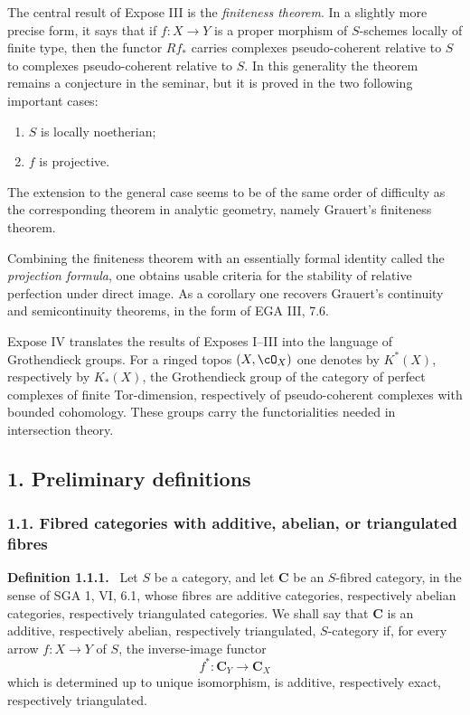 \documentclass[11pt]{article}
\theoremstyle{plain}
\theoremstyle{definition}
\theoremstyle{remark}
\newenvironment{statement}[1]{\par\medskip\noindent\textbf{#1.}\ }{\par\medskip}
\begin{document}
The central result of Expose III is the \emph{finiteness theorem}. In a slightly more precise form, it says that if $f:X\to Y$ is a proper morphism of $S$-schemes locally of finite type, then the functor $Rf_*$ carries complexes pseudo-coherent relative to $S$ to complexes pseudo-coherent relative to $S$. In this generality the theorem remains a conjecture in the seminar, but it is proved in the two following important cases:
\begin{enumerate}[label=\alph*)]
\item $S$ is locally noetherian;
\item $f$ is projective.
\end{enumerate}
The extension to the general case seems to be of the same order of difficulty as the corresponding theorem in analytic geometry, namely Grauert's finiteness theorem.

Combining the finiteness theorem with an essentially formal identity called the \emph{projection formula}, one obtains usable criteria for the stability of relative perfection under direct image. As a corollary one recovers Grauert's continuity and semicontinuity theorems, in the form of EGA III, 7.6.

Expose IV translates the results of Exposes I--III into the language of Grothendieck groups. For a ringed topos $(X,\cO_X)$ one denotes by $K^*(X)$, respectively by $K_*(X)$, the Grothendieck group of the category of perfect complexes of finite Tor-dimension, respectively of pseudo-coherent complexes with bounded cohomology. These groups carry the functorialities needed in intersection theory.

\subsection*{1. Preliminary definitions}

\subsubsection*{1.1. Fibred categories with additive, abelian, or triangulated fibres}

\begin{statement}{Definition 1.1.1}
Let $S$ be a category, and let $\mathbf C$ be an $S$-fibred category, in the sense of SGA 1, VI, 6.1, whose fibres are additive categories, respectively abelian categories, respectively triangulated categories. We shall say that $\mathbf C$ is an additive, respectively abelian, respectively triangulated, $S$-category if, for every arrow $f:X\to Y$ of $S$, the inverse-image functor
\[
   f^*:\mathbf C_Y\longrightarrow \mathbf C_X
\]
which is determined up to unique isomorphism, is additive, respectively exact, respectively triangulated.
\end{statement}
\end{document}

